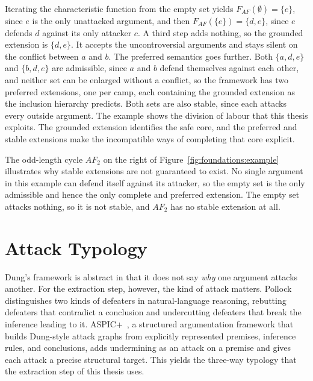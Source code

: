 Iterating the characteristic function from the empty set yields
$F_{AF}(\emptyset) = \{e\}$, since $e$ is the only unattacked argument, and
then $F_{AF}(\{e\}) = \{d, e\}$, since $e$ defends $d$ against its only
attacker $c$. A third step adds nothing, so the grounded extension is
$\{d, e\}$. It accepts the uncontroversial arguments and stays silent on the
conflict between $a$ and $b$. The preferred semantics goes further. Both
$\{a, d, e\}$ and $\{b, d, e\}$ are admissible, since $a$ and $b$ defend
themselves against each other, and neither set can be enlarged without a
conflict, so the framework has two preferred extensions, one per camp, each
containing the grounded extension as the inclusion hierarchy predicts. Both
sets are also stable, since each attacks every outside argument. The example
shows the division of labour that this thesis exploits. The grounded extension
identifies the safe core, and the preferred and stable extensions make the
incompatible ways of completing that core explicit.

The odd-length cycle $AF_2$ on the right of
Figure~\ref{fig:foundations:example}
illustrates why stable extensions are not guaranteed to exist. No single
argument in this example can defend itself against its attacker, so the empty set is the only
admissible and hence the only complete and preferred extension. The empty set
attacks nothing, so it is not stable, and $AF_2$ has no stable extension at
all.

\section{Attack Typology}
\label{sec:foundations:typology}

Dung's framework is abstract in that it does not say \emph{why} one argument
attacks another. For the extraction step, however, the kind of attack matters.
Pollock~\cite{pollock1992} distinguishes two kinds of defeaters in
natural-language reasoning, rebutting defeaters that contradict a conclusion
and undercutting defeaters that break the inference leading to it.
ASPIC+~\cite{modgil2014}, a structured argumentation framework that builds
Dung-style attack graphs from explicitly represented premises, inference
rules, and conclusions, adds undermining as an attack on a premise and gives
each attack a precise structural target. This yields the three-way typology
that the extraction step of this thesis uses.

